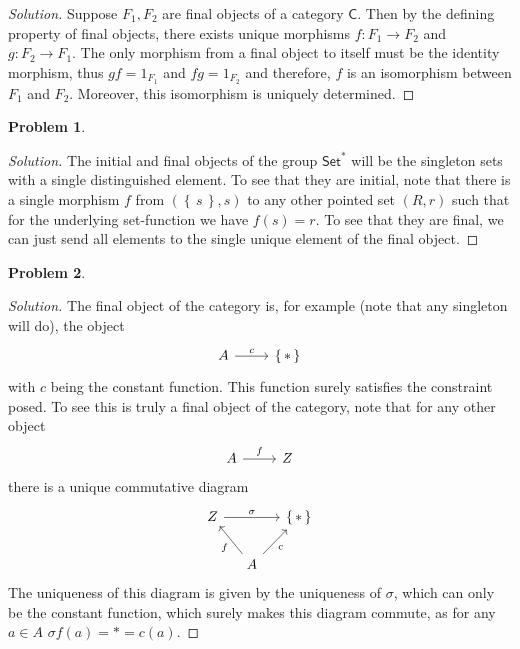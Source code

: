 \documentclass{article}
\theoremstyle{definition}
\newtheorem{problem-internal}{Problem}[subsection]
\newenvironment{problem}{
	\medskip
	\begin{problem-internal}
	}{
\end{problem-internal}
}
\newenvironment{solution}{
	\begin{proof}[Solution]
		\vspace{-8px}
		\setlength{\parskip}{4px}
		\setlength{\parindent}{0px}
	}{
\end{proof}
}
\newcommand{\set}[1]{\left\{\,#1\,\right\}}
\newcommand{\C}{\mathsf{C}}
\begin{document}
\begin{solution}
	Suppose $F_1, F_2$ are final objects of a category $\C$. Then by the defining property of final objects, there exists unique morphisms $f: F_1 \to F_2$ and $g: F_2 \to F_1$. The only morphism from a final object to itself must be the identity morphism, thus $gf = 1_{F_1}$ and $fg = 1_{F_2}$ and therefore, $f$ is an isomorphism between $F_1$ and $F_2$. Moreover, this isomorphism is uniquely determined.
\end{solution}

\begin{problem}
\end{problem}

\begin{solution}
	The initial and final objects of the group $\mathsf{Set}^*$ will be the singleton sets with a single distinguished element. To see that they are initial, note that there is a single morphism $f$ from $(\set{s}, s)$ to any other pointed set $(R, r)$ such that for the underlying set-function we have $f(s)=r$. To see that they are final, we can just send all elements to the single unique element of the final object.
\end{solution}

\begin{problem}
\end{problem}

\begin{solution}
	The final object of the category is, for example (note that any singleton will do), the object
	\begin{equation*}
		\begin{tikzcd}
			A \arrow[r, "c"] & \set{*}
		\end{tikzcd}
	\end{equation*}
	with $c$ being the constant function. This function surely satisfies the constraint posed. To see this is truly a final object of the category, note that for any other object
	\begin{equation*}
		\begin{tikzcd}
			A \arrow[r, "f"] & Z
		\end{tikzcd}
	\end{equation*}
	there is a unique commutative diagram
	\begin{equation*}
		\begin{tikzcd}[column sep=small]
			Z \arrow[rr, "\sigma"] & & \set{*} \\
			& A \arrow[ul, "f"] \arrow[ur, "c" swap] &
		\end{tikzcd}
	\end{equation*}
	The uniqueness of this diagram is given by the uniqueness of $\sigma$, which can only be the constant function, which surely makes this diagram commute, as for any $a \in A$ $\sigma f(a) = * = c(a)$.
\end{solution}
\end{document}
